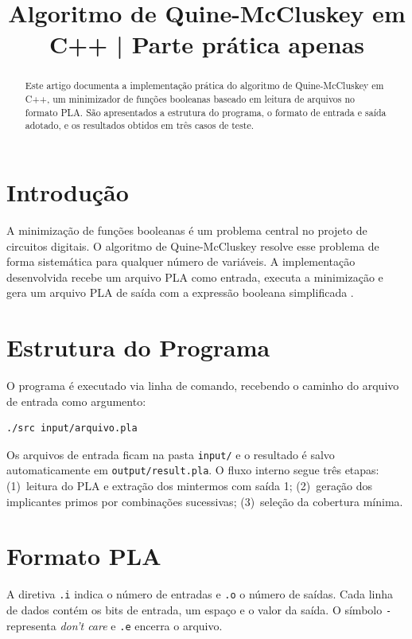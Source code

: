 \documentclass[conference]{IEEEtran}
\title{Algoritmo de Quine-McCluskey em C++ | Parte prática apenas}
\begin{document}
\maketitle

\begin{abstract}
Este artigo documenta a implementação prática do algoritmo de Quine-McCluskey
em C++, um minimizador de funções booleanas baseado em leitura de arquivos no
formato PLA. São apresentados a estrutura do programa, o formato de entrada e
saída adotado, e os resultados obtidos em três casos de teste.
\end{abstract}

\section{Introdução}

A minimização de funções booleanas é um problema central no projeto de circuitos
digitais. O algoritmo de Quine-McCluskey \cite{mccluskey1956} resolve esse
problema de forma sistemática para qualquer número de variáveis. A implementação
desenvolvida recebe um arquivo PLA como entrada, executa a minimização e gera
um arquivo PLA de saída com a expressão booleana simplificada \cite{stroustrup2013}.

\section{Estrutura do Programa}

O programa é executado via linha de comando, recebendo o caminho do arquivo
de entrada como argumento:

\begin{lstlisting}[style=pla]
./src input/arquivo.pla
\end{lstlisting}

Os arquivos de entrada ficam na pasta \texttt{input/} e o resultado é salvo
automaticamente em \texttt{output/result.pla}. O fluxo interno segue três
etapas: (1)~leitura do PLA e extração dos mintermos com saída 1;
(2)~geração dos implicantes primos por combinações sucessivas;
(3)~seleção da cobertura mínima.

\section{Formato PLA}

A diretiva \texttt{.i} indica o número de entradas e \texttt{.o} o número de
saídas. Cada linha de dados contém os bits de entrada, um espaço e o valor
da saída. O símbolo \texttt{-} representa \textit{don't care} e \texttt{.e}
encerra o arquivo.
\end{document}
